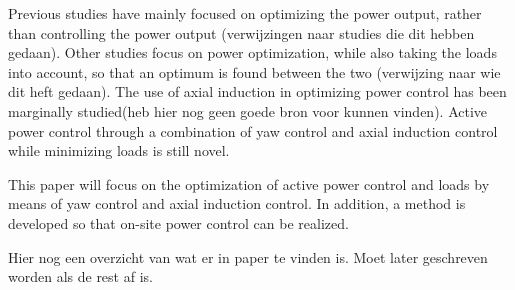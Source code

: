 Previous studies have mainly focused on optimizing the power output, rather than controlling the power output (verwijzingen naar studies die dit hebben gedaan).  Other studies focus on power optimization, while also taking the loads into account, so that an optimum is found between the two (verwijzing naar wie dit heft gedaan). The use of axial induction in optimizing power control has been marginally studied(heb hier nog geen goede bron voor kunnen vinden). Active power control through a combination of yaw control and axial induction control while minimizing loads is still novel.

This paper will focus on the optimization of active power control and loads by means of yaw control and axial induction control. In addition, a method is developed so that on-site power control can be realized.
	
Hier nog een overzicht van wat er in paper te vinden is. Moet later geschreven worden als de rest af is.